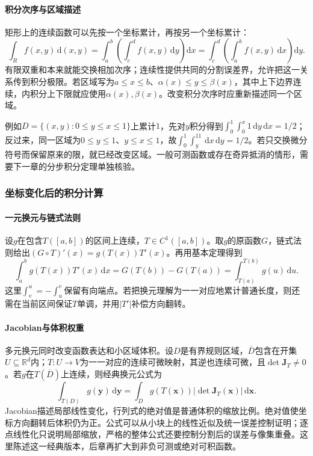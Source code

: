 \paragraph{积分次序与区域描述}

矩形上的连续函数可以先按一个坐标累计，再按另一个坐标累计：
\[
 \int_R f(x,y)\,\mathrm d(x,y)
 =\int_a^b\left(\int_c^d f(x,y)\,\mathrm dy\right)\mathrm dx
 =\int_c^d\left(\int_a^b f(x,y)\,\mathrm dx\right)\mathrm dy.
\]
有限双重和本来就能交换相加次序；连续性提供共同的分割误差界，允许把这一关系传到积分极限。若区域写为$a\leq x\leq b$、$\alpha(x)\leq y\leq\beta(x)$，其中上下边界连续，内积分上下限就应使用$\alpha(x),\beta(x)$。改变积分次序时应重新描述同一个区域。

例如$D=\{(x,y):0\leq y\leq x\leq1\}$上累计$1$，先对$y$积分得到$\int_0^1\int_0^x1\,\mathrm dy\,\mathrm dx=1/2$；反过来，同一区域为$0\leq y\leq1$、$y\leq x\leq1$，故$\int_0^1\int_y^11\,\mathrm dx\,\mathrm dy=1/2$。若只交换微分符号而保留原来的限，就已经改变区域。一般可测函数或存在奇异抵消的情形，需要下一章的分步积分定理单独核验。

\subsubsection{坐标变化后的积分计算}
\label{sec:analysis-coordinate-change-integral-applications}

\paragraph{一元换元与链式法则}

设$g$在包含$T([a,b])$的区间上连续，$T\in C^1([a,b])$。取$g$的原函数$G$，链式法则给出$(G\circ T)'(x)=g(T(x))T'(x)$。再用基本定理得到
\[
 \int_a^b g(T(x))T'(x)\,\mathrm dx
 =G(T(b))-G(T(a))=\int_{T(a)}^{T(b)}g(u)\,\mathrm du.
\]
这里$\int_v^u=-\int_u^v$保留有向端点。若把换元理解为一一对应地累计普通长度，则还需在当前区间保证$T$单调，并用$|T'|$补偿方向翻转。

\paragraph{Jacobian与体积权重}

多元换元同时改变函数表达和小区域体积。设$D$是有界规则区域，$\overline D$包含在开集$U\subseteq\mathbb R^d$内；$T:U\to V$为一一对应的连续可微映射，其逆也连续可微，且$\det\bm J_T\neq0$。若$g$在$T(\overline D)$上连续，则经典换元公式为
\begin{equation}
 \int_{T(D)}g(\bm y)\,\mathrm d\bm y
 =\int_D g(T(\bm x))\left|\det\bm J_T(\bm x)\right|\,\mathrm d\bm x.
\label{eq:analysis-multivariate-change-variables}
\end{equation}
Jacobian描述局部线性变化，行列式的绝对值是普通体积的缩放比例。绝对值使坐标方向翻转后体积仍为正。公式可以从小块上的线性近似及统一误差控制证明；逐点线性化只说明局部缩放，严格的整体公式还要控制分割后的误差与像集重叠。这里陈述这一经典版本，后章再扩大到非负可测或绝对可积函数。

